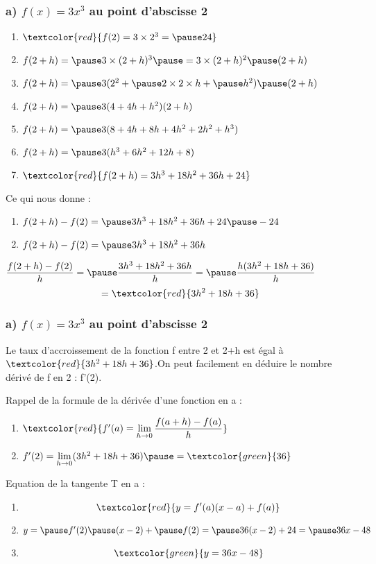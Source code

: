 \documentclass[t]{beamer}
\begin{document}
	\begin{frame}
		\frametitle{a) $f(x) = 3x^3$ au point d'abscisse 2}
		\pause
		\begin{enumerate}[]
			\item \(\textcolor{red}{f(2) =  3 \times 2^3 = \pause 24}\)
			\pause
			\item \(f(2+h) = \pause 3 \times (2+h)^3 \pause = 3 \times (2+h)^2 \pause(2+h) \)
			\pause
			\item \(f(2+h) = \pause 3(2^2 + \pause 2 \times 2 \times h + \pause h^2) \pause (2+h)\)
			\pause
			\item \(f(2+h) = \pause 3(4 + 4h + h^2)(2+h)\)
			\pause
			\item \(f(2+h) = \pause 3(8 + 4h + 8h + 4h^2 + 2h^2 + h^3)\)
			\pause
			\item \(f(2+h) =\pause  3(h^3 + 6h^2 + 12h + 8)\)
			\pause
			\item \(\textcolor{red}{f(2+h) = 3h^3 + 18h^2 + 36h + 24}\)
			\pause
		\end{enumerate}
		\begin{block}{Ce qui nous donne :}
			\pause
			\begin{enumerate}[]
				\item \(f(2+h) - f(2) = \pause 3h^3 + 18h^2 + 36h + 24 \pause - 24 \)
				\pause
				\item \(f(2+h) - f(2) = \pause 3h^3 + 18h^2 + 36h \)
			\end{enumerate}
		\end{block}
		\pause
		\( \dfrac{f(2+h) - f(2)}{h} = \pause \dfrac{3h^3 + 18h^2 + 36h}{h} = \pause \dfrac{h(3h^2 + 18h + 36)}{h}\)
		\pause
		\[=\textcolor{red}{3h^2 + 18h + 36}\]
	\end{frame}

	\begin{frame}
		\frametitle{a) $f(x) = 3x^3$ au point d'abscisse 2}
		\pause
		Le taux d'accroissement de la fonction f entre 2 et 2+h est égal à \pause $\textcolor{red}{3h^2 + 18h + 36}$.\pause On peut facilement en déduire le nombre dérivé de f \pause en 2 : f'(2).
		\pause

		Rappel de la formule de la dérivée d'une fonction en a : 
		\pause
		\begin{enumerate}[]
			\item<+-> \(\textcolor{red}{f'(a) = \lim\limits_{h \rightarrow 0}\dfrac{f(a+h)-f(a)}{h}}\)
			\item<+-> \(f'(2) = \lim\limits_{h \rightarrow 0} (3h^2 + 18h + 36) \pause = \textcolor{green}{36} \)
			\pause
		\end{enumerate}

		Equation de la tangente T en a :
		\pause
		\begin{enumerate}[]
			\item \[\textcolor{red}{y = f'(a)(x-a) + f(a)}\]
			\pause
			\item \(y= \pause f'(2) \pause (x-2) + \pause f(2) = \pause 36(x-2) + 24 = \pause 36x -48 \)
			\pause
			\item \[\textcolor{green}{y = 36x -48} \]
		\end{enumerate}
	\end{frame}
\end{document}
